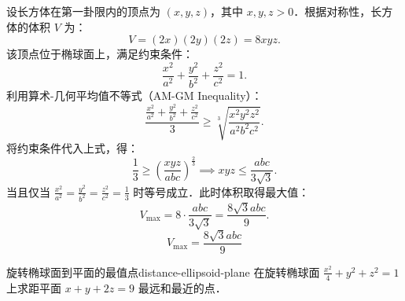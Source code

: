 \begin{solution}
    设长方体在第一卦限内的顶点为 $(x, y, z)$，其中 $x, y, z > 0$．根据对称性，长方体的体积 $V$ 为：
    \begin{equation}
        V = (2x)(2y)(2z) = 8xyz.
    \end{equation}
    该顶点位于椭球面上，满足约束条件：
    \begin{equation}
        \frac{x^2}{a^2} + \frac{y^2}{b^2} + \frac{z^2}{c^2} = 1.
    \end{equation}
    利用算术-几何平均值不等式（AM-GM Inequality）：
    \begin{equation}
        \frac{\frac{x^2}{a^2} + \frac{y^2}{b^2} + \frac{z^2}{c^2}}{3} \ge \sqrt[3]{\frac{x^2 y^2 z^2}{a^2 b^2 c^2}}.
    \end{equation}
    将约束条件代入上式，得：
    \begin{equation}
        \frac{1}{3} \ge \left( \frac{xyz}{abc} \right)^{\frac{2}{3}} \implies xyz \le \frac{abc}{3\sqrt{3}}.
    \end{equation}
    当且仅当 $\frac{x^2}{a^2} = \frac{y^2}{b^2} = \frac{z^2}{c^2} = \frac{1}{3}$ 时等号成立．此时体积取得最大值：
    \begin{equation}
        V_{\max} = 8 \cdot \frac{abc}{3\sqrt{3}} = \frac{8\sqrt{3} abc}{9}.
    \end{equation}
    \begin{equation}
        \boxed{V_{\max} = \frac{8\sqrt{3} abc}{9}}
    \end{equation}
\end{solution}


\begin{problem}{旋转椭球面到平面的最值点}{distance-ellipsoid-plane}
    在旋转椭球面 $\frac{x^2}{4} + y^2 + z^2 = 1$ 上求距平面 $x + y + 2z = 9$ 最远和最近的点．
\end{problem}

